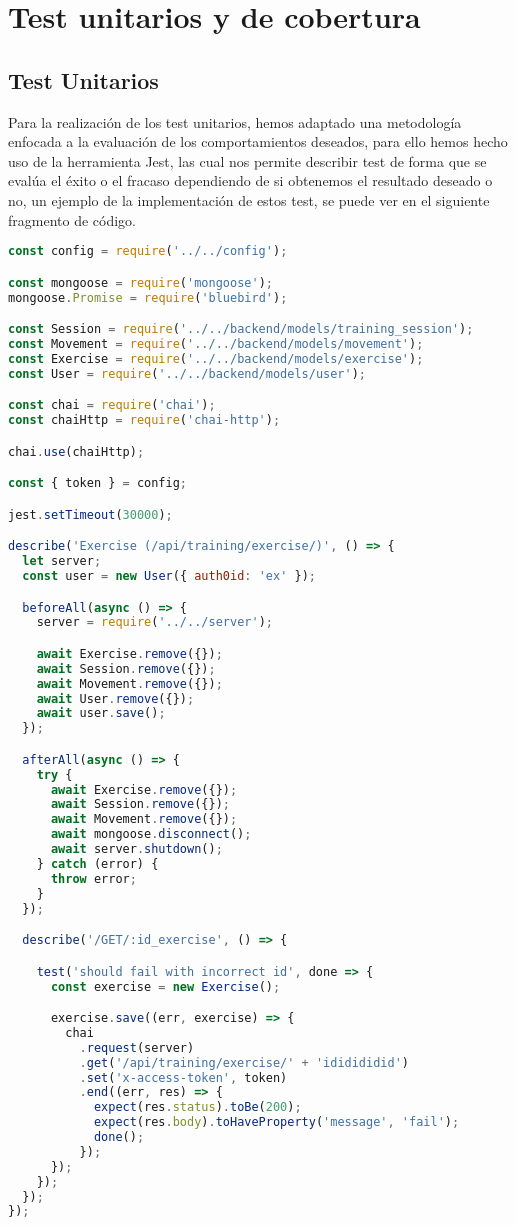 \section {Test unitarios y de cobertura}
\subsection {Test Unitarios}
Para la realización de los test unitarios, hemos adaptado una metodología enfocada a la evaluación de los comportamientos deseados, para ello hemos hecho uso de la herramienta Jest, las cual nos permite describir test de forma que se evalúa el éxito o el fracaso dependiendo de si obtenemos el resultado deseado o no, un ejemplo de la implementación de estos test, se puede ver en el siguiente fragmento de código.
\begin{lstlisting}[language=javascript,caption={Test Unitarios},label={lst:appjs}]
const config = require('../../config');

const mongoose = require('mongoose');
mongoose.Promise = require('bluebird');

const Session = require('../../backend/models/training_session');
const Movement = require('../../backend/models/movement');
const Exercise = require('../../backend/models/exercise');
const User = require('../../backend/models/user');

const chai = require('chai');
const chaiHttp = require('chai-http');

chai.use(chaiHttp);

const { token } = config;

jest.setTimeout(30000);

describe('Exercise (/api/training/exercise/)', () => {
  let server;
  const user = new User({ auth0id: 'ex' });

  beforeAll(async () => {
    server = require('../../server');

    await Exercise.remove({});
    await Session.remove({});
    await Movement.remove({});
    await User.remove({});
    await user.save();
  });

  afterAll(async () => {
    try {
      await Exercise.remove({});
      await Session.remove({});
      await Movement.remove({});
      await mongoose.disconnect();
      await server.shutdown();
    } catch (error) {
      throw error;
    }
  });

  describe('/GET/:id_exercise', () => {

    test('should fail with incorrect id', done => {
      const exercise = new Exercise();

      exercise.save((err, exercise) => {
        chai
          .request(server)
          .get('/api/training/exercise/' + 'ididididid')
          .set('x-access-token', token)
          .end((err, res) => {
            expect(res.status).toBe(200);
            expect(res.body).toHaveProperty('message', 'fail');
            done();
          });
      });
    });
  });
});
\end{lstlisting}
